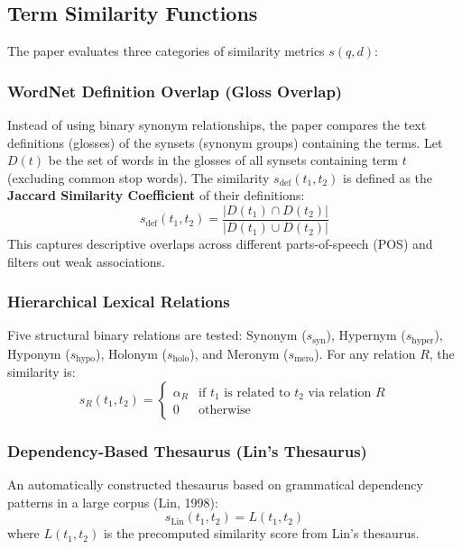 \documentclass[11pt,a4paper]{article}
\begin{document}
\subsection{Term Similarity Functions}
The paper evaluates three categories of similarity metrics $s(q, d)$:

\subsubsection{WordNet Definition Overlap (Gloss Overlap)}
Instead of using binary synonym relationships, the paper compares the text definitions (glosses) of the synsets (synonym groups) containing the terms. Let $D(t)$ be the set of words in the glosses of all synsets containing term $t$ (excluding common stop words). The similarity $s_{\text{def}}(t_1, t_2)$ is defined as the \textbf{Jaccard Similarity Coefficient} of their definitions:
\begin{equation}
s_{\text{def}}(t_1, t_2) = \frac{|D(t_1) \cap D(t_2)|}{|D(t_1) \cup D(t_2)|}
\end{equation}
This captures descriptive overlaps across different parts-of-speech (POS) and filters out weak associations.

\subsubsection{Hierarchical Lexical Relations}
Five structural binary relations are tested: Synonym ($s_{\text{syn}}$), Hypernym ($s_{\text{hyper}}$), Hyponym ($s_{\text{hypo}}$), Holonym ($s_{\text{holo}}$), and Meronym ($s_{\text{mero}}$). For any relation $R$, the similarity is:
\begin{equation}
s_R(t_1, t_2) = \begin{cases} \alpha_R & \text{if } t_1 \text{ is related to } t_2 \text{ via relation } R \\ 0 & \text{otherwise} \end{cases}
\end{equation}

\subsubsection{Dependency-Based Thesaurus (Lin's Thesaurus)}
An automatically constructed thesaurus based on grammatical dependency patterns in a large corpus (Lin, 1998):
\begin{equation}
s_{\text{Lin}}(t_1, t_2) = L(t_1, t_2)
\end{equation}
where $L(t_1, t_2)$ is the precomputed similarity score from Lin's thesaurus.
\end{document}
